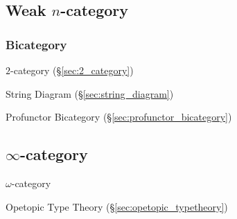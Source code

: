 \subsection{Weak $n$-category}\label{sec:weak_ncategory}

\subsubsection{Bicategory}\label{sec:bicategory}

$2$-category (\S\ref{sec:2_category})

String Diagram (\S\ref{sec:string_diagram})

Profunctor Bicategory (\S\ref{sec:profunctor_bicategory})



\subsection{$\infty$-category}\label{sec:infinity_category}

$\omega$-category

Opetopic Type Theory (\S\ref{sec:opetopic_typetheory})
